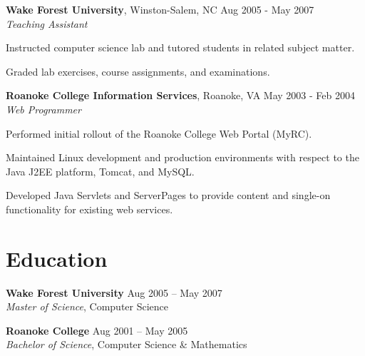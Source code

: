 \documentclass[margin,line]{resume}
\begin{document}
\begin{resume}
  \newpage

  \textbf{Wake Forest University}, Winston-Salem, NC \hfill Aug 2005 - May 2007\vspace{1mm}\\
  \textsl{Teaching Assistant}\\
  \vspace{-3mm}
  \begin{list2}
  \item Instructed computer science lab and tutored students in
    related subject matter.
  \item Graded lab exercises, course assignments, and examinations.
  \end{list2}

  \textbf{Roanoke College Information Services}, Roanoke, VA \hfill May 2003 - Feb 2004\vspace{1mm}\\
  \textsl{Web Programmer}\\
  \vspace{-3mm}
  \begin{list2}
  \item Performed initial rollout of the Roanoke College Web Portal (MyRC).
  \item Maintained Linux development and production environments with
    respect to the Java J2EE platform, Tomcat, and MySQL.
  \item Developed Java Servlets and ServerPages to provide content and
    single-on functionality for existing web services.
  \end{list2}



  \section{\mysidestyle \textcolor{mySideColor}{Education}}

  \textbf{Wake Forest University}\vspace{2mm} \hfill Aug 2005 -- May 2007\\
  \textsl{Master of Science}, Computer Science\vspace{-1mm}

  \textbf{Roanoke College}\vspace{2mm} \hfill Aug 2001 -- May 2005\\
  \textsl{Bachelor of Science}, Computer Science \& Mathematics\vspace{-1mm}


\end{resume}
\end{document}
